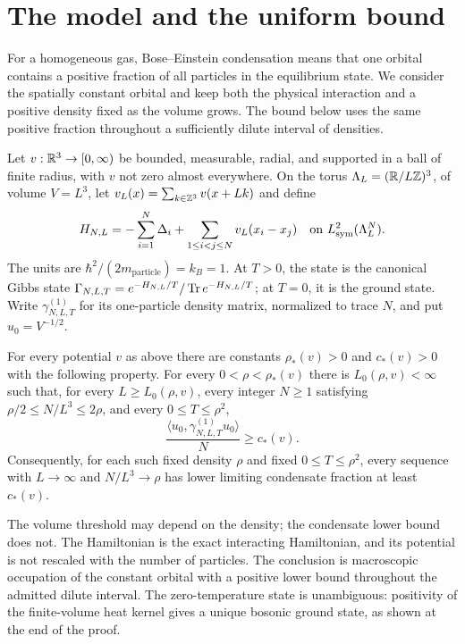 \section{The model and the uniform bound}\label{sec:introduction}

For a homogeneous gas, Bose--Einstein condensation means that one orbital
contains a positive fraction of all particles in the equilibrium state.
We consider the spatially constant orbital and keep both the physical
interaction and a positive density fixed as the volume grows.
The bound below uses the same positive fraction throughout a sufficiently
dilute interval of densities.

Let $v:\mathbb R^3\to[0,\infty)$ be bounded, measurable, radial, and supported
in a ball of finite radius, with $v$ not zero almost everywhere.
On the torus $\Lambda_L=(\mathbb R/L\mathbb Z)^3$, of volume $V=L^3$, let
$v_L(x)=\sum_{k\in\mathbb Z^3}v(x+Lk)$ and define
\[
 H_{N,L}=-\sum_{i=1}^N\Delta_i+
                \sum_{1\le i<j\le N}v_L(x_i-x_j)
 \quad\hbox{on }L^2_{\mathrm{sym}}(\Lambda_L^N).
\]
The units are $\hbar^2/(2m_{\mathrm{particle}})=k_B=1$.
At $T>0$, the state is the canonical Gibbs state
$\Gamma_{N,L,T}=e^{-H_{N,L}/T}/\operatorname{Tr} e^{-H_{N,L}/T}$; at $T=0$, it is
the ground state. Write $\gamma^{(1)}_{N,L,T}$ for its one-particle
density matrix, normalized to trace $N$, and put $u_0=V^{-1/2}$.

\begin{theorem}\label{thm:main}
For every potential $v$ as above there are constants
$\rho_*(v)>0$ and $c_*(v)>0$ with the following property.
For every $0<\rho<\rho_*(v)$ there is $L_0(\rho,v)<\infty$ such that,
for every $L\ge L_0(\rho,v)$, every integer $N\ge1$ satisfying
$\rho/2\le N/L^3\le2\rho$, and every $0\le T\le\rho^2$,
\[
 \frac{\langle u_0,\gamma^{(1)}_{N,L,T}u_0\rangle}{N}
 \ge c_*(v).
\]
Consequently, for each such fixed density $\rho$ and fixed
$0\le T\le\rho^2$, every sequence with $L\to\infty$ and
$N/L^3\to\rho$ has lower limiting condensate fraction at least $c_*(v)$.
\end{theorem}

The volume threshold may depend on the density; the condensate lower
bound does not. The Hamiltonian is the exact interacting Hamiltonian,
and its potential is not rescaled with the number of particles.
The conclusion is macroscopic occupation of the constant orbital with
a positive lower bound throughout the admitted dilute interval. The
zero-temperature state is unambiguous: positivity of the finite-volume
heat kernel gives a unique bosonic ground state, as shown at the end
of the proof.

